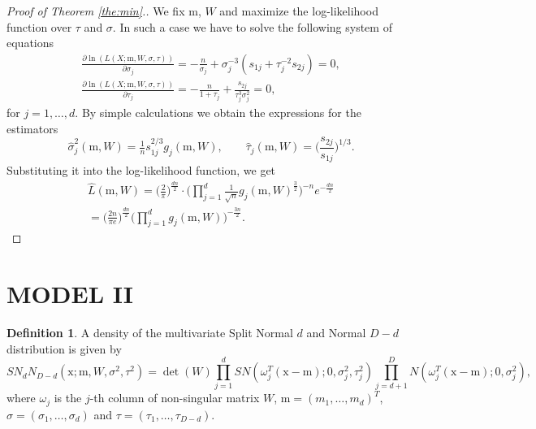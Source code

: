 \documentclass[12pt]{article}
\def\w{\omega}
\def\x{\mathrm{x}}
\def\m{\mathrm{m}}
\theoremstyle{definition}
\newtheorem{definition}{Definition}[section]
\def\w{\omega}
\begin{document}
\begin{proof}[Proof of Theorem \ref{the:min}.]
We fix  $\m$, $W$ and maximize the log-likelihood function over $\tau$ and $\sigma$.
In such a case we have to solve the following system of equations
$$
\begin{array}{l}
\frac{\partial  \ln ( L(X;\m,W,\sigma,\tau) ) }{\partial \sigma_j} = -\frac{n}{\sigma_j} +  \sigma_j^{-3} (s_{1j} + \tau_j^{-2} s_{2j} )
 =0, \\[6pt] %
 \frac{\partial  \ln ( L(X;\m,W,\sigma,\tau) ) }{\partial \tau_j} = - \frac{n}{1+\tau_j} + \frac{s_{2j}}{\tau_j^{3}\sigma_j^{2}} =0 , %
\end{array}
$$
for  $ j=1,\ldots,d$.
By simple calculations we obtain the expressions for the estimators
$$
\hat{\sigma}_j^2(\m,W) = 
\tfrac{1}{n} s_{1j}^{2/3} g_{j}(\m,W), \qquad
\hat{\tau}_{j}(\m,W) = \bigg( \frac{s_{2j}}{s_{1j}} \bigg)^{1/3}.
$$
Substituting it into the log-likelihood function,
we get
$$
\begin{array}{l}
\hat{L}(\m,W) = \bigg( \frac{2}{\pi} \bigg)^{\frac{dn}{2}}   \cdot \Big( \prod\limits_{j=1}^{d} \frac{1}{\sqrt{n}} g_j(\m,W)^{\frac{3}{2}} \Big)^{-n}  e^{-\frac{dn}{2}}\\[6pt]
= \bigg( \frac{2n}{\pi e} \bigg)^{\frac{dn}{2}}  \Big(  \prod\limits_{j=1}^{d} g_j(\m,W) \Big)^{-\frac{3n}{2}}. 
\end{array}
$$
\end{proof}

\section{MODEL II}

\begin{definition}\label{def:GSN}
A density of the multivariate Split Normal $d$ and Normal $D-d$ distribution is given by
$$
 SN_{d}N_{D-d}(\x; \m,W, \sigma^2,\tau^2)=\det(W) \prod_{j=1}^{d} SN(\w_j^T(\x-\m);0,\sigma_j^2,\tau_j^2)\prod_{j=d+1}^{D} N(\w_j^T(\x-\m);0,\sigma_j^2),
$$
where $\w_{j}$ is the $j$-th column of non-singular matrix $W$, $\m = (m_1, \ldots, m_d)^T$, $\sigma = (\sigma_{1},\ldots,\sigma_{d})$ and $\tau=(\tau_{1},\ldots,\tau_{D-d})$.
\end{definition}
\end{document}
